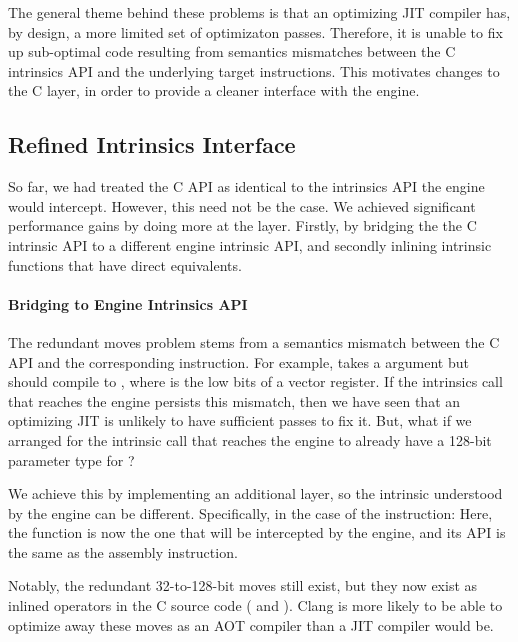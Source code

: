 The general theme behind these problems is that an optimizing JIT compiler has,
by design, a more limited set of optimizaton passes. Therefore, it is unable to
fix up sub-optimal code resulting from semantics mismatches between the C
intrinsics API and the underlying target instructions. This motivates changes to
the C layer, in order to provide a cleaner interface with the \wasm engine.

\subsection{Refined Intrinsics Interface}

So far, we had treated the C API as identical to the intrinsics API the engine
would intercept. However, this need not be the case. We achieved significant
performance gains by doing more at the  layer. Firstly, by
bridging the the C intrinsic API to a different engine intrinsic API, and
secondly inlining intrinsic functions that have direct \wasm equivalents.

\newcommand{\changeargmap}{Bridging to Engine Intrinsics API}
\paragraph{\changeargmap}

The redundant moves problem stems from a semantics mismatch between the C API
and the corresponding instruction.  For example,  takes a
 argument but should compile to ,
where  is the low bits of a vector register. If the intrinsics call
that reaches the \wasm engine persists this mismatch, then we have seen that an
optimizing JIT is unlikely to have sufficient passes to fix it. But, what if we
arranged for the intrinsic call that reaches the engine to already have a
128-bit parameter type for ?

We achieve this by implementing an additional layer, so the intrinsic understood
by the engine can be different. Specifically, in the case of the 
instruction:
%
%
Here, the  function is now the one that will be
intercepted by the engine, and its API is the same as the assembly instruction.

Notably, the redundant 32-to-128-bit moves still exist, but they now exist as
inlined \wasm operators in the C source code ( and
). Clang is more likely to be able to optimize away
these moves as an AOT compiler than a JIT compiler would be.

